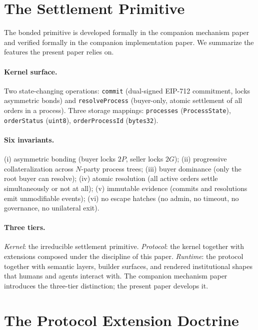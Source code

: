 \documentclass[11pt,a4paper]{article}
\theoremstyle{definition}
\theoremstyle{remark}
\begin{document}
\section{The Settlement Primitive}
\label{sec:primitive}

The bonded primitive is developed formally in the companion
mechanism paper and verified formally in the companion implementation
paper. We summarize the features the present paper relies on.

\paragraph{Kernel surface.}
Two state-changing operations: \texttt{commit} (dual-signed EIP-712
commitment, locks asymmetric bonds) and \texttt{resolveProcess}
(buyer-only, atomic settlement of all orders in a process). Three
storage mappings: \texttt{processes} (\texttt{ProcessState}),
\texttt{orderStatus} (\texttt{uint8}), \texttt{orderProcessId}
(\texttt{bytes32}).

\paragraph{Six invariants.}
(i) asymmetric bonding (buyer locks $2P$, seller locks $2G$);
(ii) progressive collateralization across $N$-party process trees;
(iii) buyer dominance (only the root buyer can resolve);
(iv) atomic resolution (all active orders settle simultaneously or
not at all);
(v) immutable evidence (commits and resolutions emit unmodifiable
events);
(vi) no escape hatches (no admin, no timeout, no governance, no
unilateral exit).

\paragraph{Three tiers.}
\emph{Kernel}: the irreducible settlement primitive. \emph{Protocol}:
the kernel together with extensions composed under the discipline of
this paper. \emph{Runtime}: the protocol together with semantic
layers, builder surfaces, and rendered institutional shapes that
humans and agents interact with. The companion mechanism paper
introduces the three-tier distinction; the present paper develops it.

\section{The Protocol Extension Doctrine}
\label{sec:doctrine}
\end{document}
